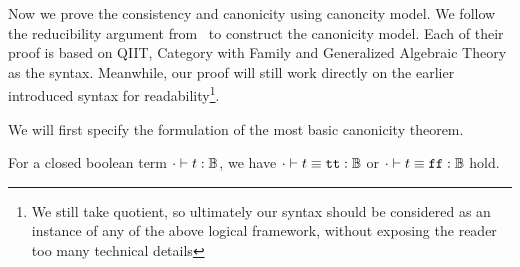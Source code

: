 Now we prove the consistency and canonicity using canoncity model. We follow the reducibility argument from~\cite{kaposi2019gluing, coquand2018canonicity,sterling2019algebraic} to construct the canonicity model.
Each of their proof is based on QIIT, Category with Family\cite{dybjer1995internal} and Generalized Algebraic Theory \cite{cartmell1986generalised} as the syntax. Meanwhile, our proof will still work directly on the earlier introduced syntax for readability\footnote{We still take quotient, so ultimately our syntax should be considered as an instance of any of the above logical framework, without exposing the reader too many technical details}.

We will first specify the formulation of the most basic canonicity theorem. 

\begin{theorem}[Canonicity]
  For a closed boolean term $ {\cdot} \vdash {t} : {\mathbb{B}} $, we have $ {\cdot} \vdash {t \equiv \ensuremath{\texttt{tt}}} : {\mathbb{B}} $ or $ {\cdot} \vdash {t \equiv \ensuremath{\texttt{ff}}} : {\mathbb{B}} $ hold.
\end{theorem}


